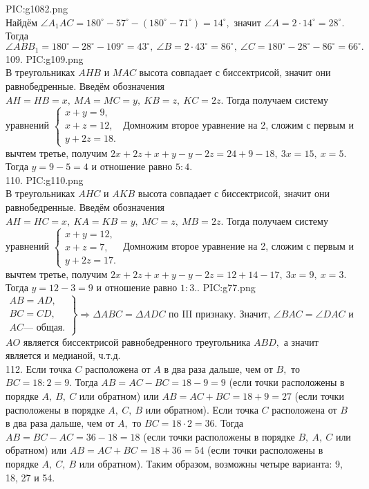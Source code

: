 {{PIC:g1082.png}}\\
Найдём $\angle A_1AC=180^\circ-57^\circ-(180^\circ-71^\circ)=14^\circ,$ значит $\angle A=2\cdot14^\circ=28^\circ.$ Тогда $\angle ABB_1=180^\circ-28^\circ-109^\circ=43^\circ,\ \angle B=2\cdot43^\circ=86^\circ,\ \angle C=180^\circ-28^\circ-86^\circ=66^\circ.$\\
109. {{PIC:g109.png}}\\
В треугольниках $AHB$ и $MAC$ высота совпадает с биссектрисой, значит они равнобедренные. Введём обозначения $AH=HB=x,\ MA=MC=y,\ KB=z,\ KC=2z.$ Тогда получаем систему уравнений $\begin{cases} x+y=9,\\ x+z=12,\\ y+2z=18.\end{cases}$ Домножим второе уравнение на 2, сложим с первым и вычтем третье, получим $2x+2z+x+y-y-2z=24+9-18,\ 3x=15,\ x=5.$ Тогда $y=9-5=4$ и отношение равно $5:4.$\\
110. {{PIC:g110.png}}\\
В треугольниках $AHC$ и $AKB$ высота совпадает с биссектрисой, значит они равнобедренные. Введём обозначения $AH=HC=x,\ KA=KB=y,\ MC=z,\ MB=2z.$ Тогда получаем систему уравнений $\begin{cases} x+y=12,\\ x+z=7,\\ y+2z=17.\end{cases}$ Домножим второе уравнение на 2, сложим с первым и вычтем третье, получим $2x+2z+x+y-y-2z=12+14-17,\ 3x=9,\ x=3.$ Тогда $y=12-3=9$ и отношение равно $1:3.$\newpage{}. {{PIC:g77.png}}\\
$\left.\begin{array}{l}AB=AD,\\
BC=CD,\\
AC\text{--- общая.}  \end{array}\right\}\Rightarrow \Delta ABC=\Delta ADC\text{ по III признаку.}$ Значит, $\angle BAC=\angle DAC$ и $AO$ является биссектрисой равнобедренного треугольника $ABD,$ а значит является и медианой, ч.т.д.\\
112. Если точка $C$ расположена от $A$ в два раза дальше, чем от $B,$ то $BC=18:2=9.$ Тогда $AB=AC-BC=18-9=9$ (если точки расположены в порядке $A,\ B,\ C$ или обратном) или $AB=AC+BC=18+9=27$ (если точки расположены в порядке $A,\ C,\ B$ или обратном). Если точка $C$ расположена от $B$ в два раза дальше, чем от $A,$ то $BC=18\cdot2=36.$ Тогда $AB=BC-AC=36-18=18$ (если точки расположены в порядке $B,\ A,\ C$ или обратном) или $AB=AC+BC=18+36=54$ (если точки расположены в порядке $A,\ C,\ B$ или обратном). Таким образом, возможны четыре варианта: 9, 18, 27 и 54.\\
